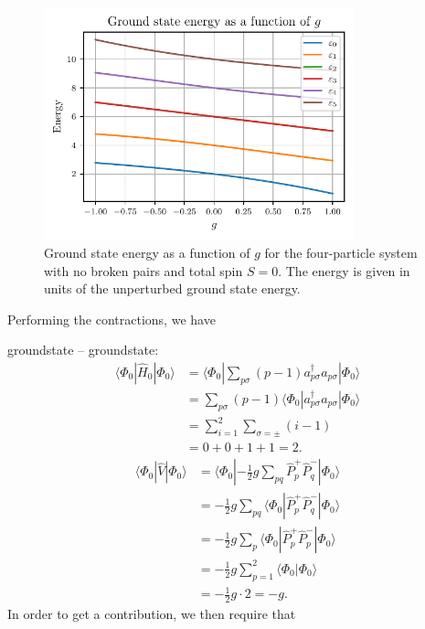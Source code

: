 \begin{figure}[htbp]
    \centering
    \includegraphics[width=0.8\textwidth]{figures/ground_state_energy.pdf}
    \caption{
        Ground state energy as a function of $g$ for the four-particle system with no broken pairs and total spin $S = 0$.
        The energy is given in units of the unperturbed ground state energy.\label{fig:groundstate}
    }
\end{figure}

Performing the contractions, we have

groundstate -- groundstate:
\begin{align*}
    \langle \Phi_0 | \hat{H}_0 | \Phi_0 \rangle
    &= \langle \Phi_0 | \sum_{p\sigma} (p - 1) a_{p\sigma}^\dagger a_{p\sigma} | \Phi_0 \rangle \\
    &= \sum_{p\sigma} (p - 1) \langle \Phi_0 | a_{p\sigma}^\dagger a_{p\sigma} | \Phi_0 \rangle \\
    &= \sum_{i = 1}^2 \sum_{\sigma = \pm} (i - 1) \\
    &= 0 + 0 + 1 + 1 = 2.
\end{align*}
\begin{align*}
    \langle \Phi_0 | \hat{V} | \Phi_0 \rangle
    &= \langle \Phi_0 | -\frac{1}{2} g \sum_{pq} \hat{P}_p^+ \hat{P}_q^- | \Phi_0 \rangle \\
    &= -\frac{1}{2} g \sum_{pq} \langle \Phi_0 | \hat{P}_p^+ \hat{P}_q^- | \Phi_0 \rangle \\
    &= -\frac{1}{2} g \sum_{p} \langle \Phi_0 | \hat{P}_p^+ \hat{P}_p^- | \Phi_0 \rangle \\
    &= -\frac{1}{2} g \sum_{p=1}^2 \langle \Phi_0 | \Phi_0 \rangle \\
    &= -\frac{1}{2} g \cdot 2 = -g.
\end{align*}
In order to get a contribution, we then require that
